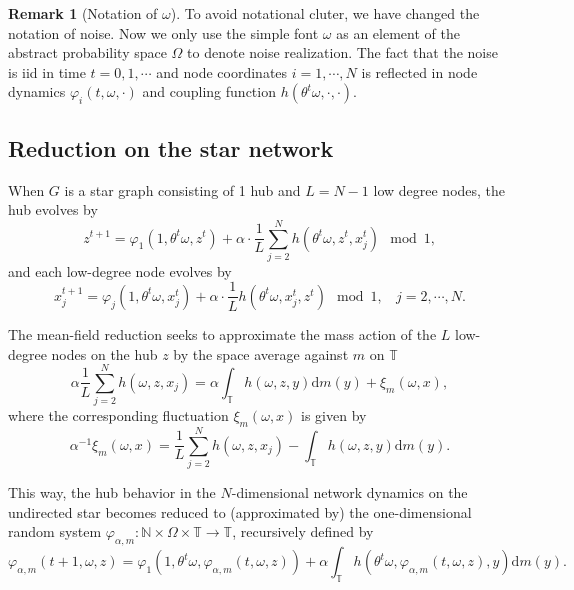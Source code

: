 \documentclass[a4paper]{article}
\theoremstyle{plain}
\theoremstyle{definition}
\newtheorem{rem}[theorem]{Remark}
\newcommand{\T}{\mathbb{T}}
\newcommand{\N}{\mathbb{N}}
\begin{document}
\begin{rem}[Notation of $\omega$]
	To avoid notational cluter, we have changed the notation of noise. Now we only use the simple font $\omega$ as an element of the abstract probability space $\Omega$ to denote noise realization. The fact that the noise is iid in time $t=0,1,\cdots$ and node coordinates $i=1,\cdots,N$ is reflected in node dynamics $\varphi_i(t,\omega,\cdot)$ and coupling function $h(\theta^t\omega,\cdot,\cdot)$.
\end{rem}



\subsection{Reduction on the star network}\label{sec:reduction_star}
When $G$ is a star graph consisting of 1 hub and $L=N-1$ low degree nodes, the hub %
evolves by
\begin{equation}\label{eq:hub}
	z^{t+1}= \varphi_1(1,\theta^t\omega,z^t)+ \alpha\cdot\frac{1}{L}\sum_{j=2}^N h(\theta^t \omega,z^t,x_j^t)\mod 1,
\end{equation}
and each  low-degree node %
evolves by
\begin{equation}\label{eq:ldn}
	x_j^{t+1} = \varphi_j(1,\theta^t\omega,x_j^t)  + \alpha \cdot \frac{1}{L} h(\theta^t\omega,x_j^t,z^t) \mod1,~~~~j=2,\cdots,N.
\end{equation}


The mean-field reduction seeks to approximate the mass action of the $L$  low-degree nodes on the hub $z$ by the space average against $m$ on $\T$
$$\alpha \frac{1}{L} \sum_{j=2}^N h(\omega,z,x_j)= \alpha\int_{\T} h(\omega,z,y)\mathrm{d} m(y) +  \xi_m(\omega,x),$$
where the corresponding fluctuation $\xi_m(\omega,x)$ is given by
\begin{equation}\label{eq:fluctuationXi}
	\alpha^{-1}\xi_m(\omega,x)= \frac{1}{L} \sum_{j=2}^N h(\omega,z,x_j) - \int_{\T} h(\omega,z,y)\mathrm{d}m(y).
\end{equation}


This way, the hub behavior in the $N$-dimensional network dynamics on the undirected star becomes reduced to (approximated by) the one-dimensional random system $\varphi_{\alpha,m}:\N\times\Omega\times \T\to \T$, recursively defined by
\begin{equation}\label{eq:reducedhub}
	\varphi_{\alpha,m}(t+1,\omega,z)=\varphi_1(1,\theta^t\omega,\varphi_{\alpha,m}(t,\omega,z)) +\alpha\int_{\T} h(\theta^t\omega,\varphi_{\alpha,m}(t,\omega,z),y)\mathrm{d} m(y).
\end{equation}
\end{document}
